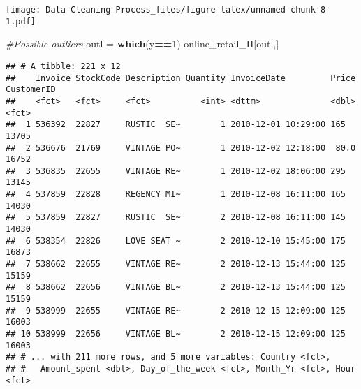 \documentclass[
]{article}
\newenvironment{Shaded}{\begin{snugshade}}{\end{snugshade}}
\newcommand{\CommentTok}[1]{\textcolor[rgb]{0.56,0.35,0.01}{\textit{#1}}}
\newcommand{\DataTypeTok}[1]{\textcolor[rgb]{0.13,0.29,0.53}{#1}}
\newcommand{\DecValTok}[1]{\textcolor[rgb]{0.00,0.00,0.81}{#1}}
\newcommand{\KeywordTok}[1]{\textcolor[rgb]{0.13,0.29,0.53}{\textbf{#1}}}
\newcommand{\NormalTok}[1]{#1}
\newcommand{\OperatorTok}[1]{\textcolor[rgb]{0.81,0.36,0.00}{\textbf{#1}}}
\newcommand{\StringTok}[1]{\textcolor[rgb]{0.31,0.60,0.02}{#1}}
\begin{document}
\begin{Shaded}
\end{Shaded}

\texttt{[image: Data-Cleaning-Process\_files/figure-latex/unnamed-chunk-8-1.pdf]}

\begin{Shaded}
\begin{Highlighting}[]
\CommentTok{#Possible outliers}
\NormalTok{outl =}\StringTok{ }\KeywordTok{which}\NormalTok{(y}\OperatorTok{==}\DecValTok{1}\NormalTok{)}
\NormalTok{online_retail_II[outl,]}
\end{Highlighting}
\end{Shaded}

\begin{verbatim}
## # A tibble: 221 x 12
##    Invoice StockCode Description Quantity InvoiceDate         Price CustomerID
##    <fct>   <fct>     <fct>          <int> <dttm>              <dbl> <fct>     
##  1 536392  22827     RUSTIC  SE~        1 2010-12-01 10:29:00 165   13705     
##  2 536676  21769     VINTAGE PO~        1 2010-12-02 12:18:00  80.0 16752     
##  3 536835  22655     VINTAGE RE~        1 2010-12-02 18:06:00 295   13145     
##  4 537859  22828     REGENCY MI~        1 2010-12-08 16:11:00 165   14030     
##  5 537859  22827     RUSTIC  SE~        2 2010-12-08 16:11:00 145   14030     
##  6 538354  22826     LOVE SEAT ~        2 2010-12-10 15:45:00 175   16873     
##  7 538662  22655     VINTAGE RE~        2 2010-12-13 15:44:00 125   15159     
##  8 538662  22656     VINTAGE BL~        2 2010-12-13 15:44:00 125   15159     
##  9 538999  22655     VINTAGE RE~        2 2010-12-15 12:09:00 125   16003     
## 10 538999  22656     VINTAGE BL~        2 2010-12-15 12:09:00 125   16003     
## # ... with 211 more rows, and 5 more variables: Country <fct>,
## #   Amount_spent <dbl>, Day_of_the_week <fct>, Month_Yr <fct>, Hour <fct>
\end{verbatim}
\end{document}
